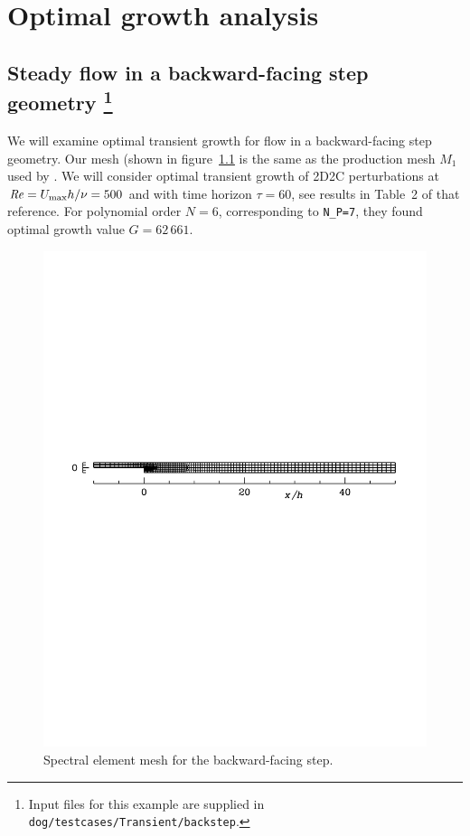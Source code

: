 \documentclass[11pt,a4paper]{report}
\newcommand\Rey{\mbox{\textit{Re}}}
\begin{document}
\chapter{Optimal growth analysis}


\section{Steady flow in a backward-facing step geometry
\protect\footnote{Input files for this example are supplied in
  \texttt{dog/testcases/Transient/backstep}.}  }
\label{sec.bfsTG}

We will examine optimal transient growth for flow in a backward-facing
step geometry.  Our mesh (shown in figure~\ref{fig.bfsmesh} is the
same as the production mesh $M_1$ used by \citet{bbs08a}.  We will
consider optimal transient growth of 2D2C perturbations at
$\Rey=U_{\max}h/\nu=500$ and with time horizon $\tau=60$, see results
in Table~2 of that reference.  For polynomial order $N=6$,
corresponding to \verb+N_P=7+, they found optimal growth value
$G=62\,661$.

\begin{figure}
\begin{center}
\includegraphics[width=\textwidth]{bfs12mesh}
\end{center}
\caption{Spectral element mesh for the backward-facing step.}
\label{fig.bfsmesh}
\end{figure}
\end{document}
